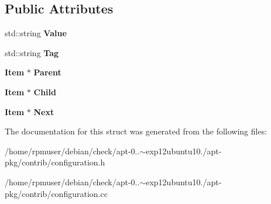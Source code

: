 \subsection*{\-Public \-Attributes}
\begin{DoxyCompactItemize}
\item 
std\-::string {\bfseries \-Value}\label{structConfiguration_1_1Item_a7ae4d22d972474ac0237b1f16e4bb9c4}

\item 
std\-::string {\bfseries \-Tag}\label{structConfiguration_1_1Item_af7ac36bec5ac2e7e5e9de05230d84009}

\item 
{\bf \-Item} $\ast$ {\bfseries \-Parent}\label{structConfiguration_1_1Item_a4b8006db4da8f6622c468f9c18dfcea6}

\item 
{\bf \-Item} $\ast$ {\bfseries \-Child}\label{structConfiguration_1_1Item_abd5fe1145fe3b512f08fee943e5f0d2e}

\item 
{\bf \-Item} $\ast$ {\bfseries \-Next}\label{structConfiguration_1_1Item_a2c2aff0fdea60c3b0247ffdb9c92a7d3}

\end{DoxyCompactItemize}


\-The documentation for this struct was generated from the following files\-:\begin{DoxyCompactItemize}
\item 
/home/rpmuser/debian/check/apt-\/0..$\sim$exp12ubuntu10./apt-\/pkg/contrib/configuration.\-h\item 
/home/rpmuser/debian/check/apt-\/0..$\sim$exp12ubuntu10./apt-\/pkg/contrib/configuration.\-cc\end{DoxyCompactItemize}
